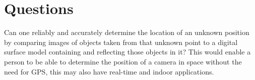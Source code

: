 

\section{Questions}

Can one reliably and accurately determine the location of an unknown position by comparing images of objects taken from that unknown point to a digital surface model containing and reflecting those objects in it? This would enable a person to be able to determine the position of a camera in space without the need for GPS, this may also have real-time and indoor applications.
